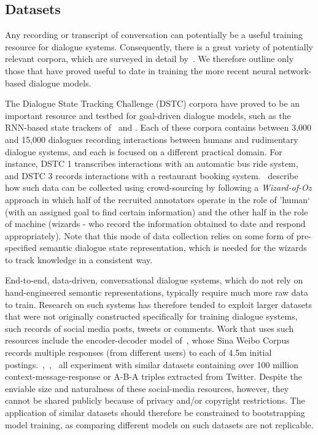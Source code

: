 \documentclass[11pt,letterpaper]{article}
\begin{document}
\subsection{Datasets}
Any recording or transcript of conversation can potentially be a useful training resource for dialogue systems. Consequently, there is a great variety of potentially relevant corpora, which are surveyed in detail by~\cite{serban2015survey}. We therefore outline only those that have proved useful to date in training the more recent neural network-based dialogue models.

The Dialogue State Tracking Challenge (DSTC) corpora have proved to be an important resource and testbed for goal-driven dialogue models, such as the RNN-based state trackers of~ and . Each of these corpora contains between 3,000 and 15,000 dialogues recording interactions between humans and rudimentary dialogue systems, and each is focused on a different practical domain. For instance, DSTC 1 transcribes interactions with an automatic bus ride system, and DSTC 3 records interactions with a restaurant booking system.~\cite{wen2016network} describe how such data can be collected using crowd-sourcing by following a \emph{Wizard-of-Oz} approach in which half of the recruited annotators operate in the role of 'human` (with an assigned goal to find certain information) and the other half in the role of machine (wizards - who record the information obtained to date and respond appropriately). Note that this mode of data collection relies on some form of pre-specified semantic dialogue state representation, which is needed for the wizards to track knowledge in a consistent way. 

End-to-end, data-driven, conversational dialogue systems, which do not rely on hand-engineered semantic representations, typically require much more raw data to train. Research on such systems has therefore tended to exploit larger datasets that were not originally constructed specifically for training dialogue systems, such records of social media posts, tweets or comments. Work that uses such resources include the encoder-decoder model of~\cite{shang2015neural}, whose Sina Weibo Corpus~\cite{shang2015neural} records multiple responses (from different users) to each of 4.5m initial postings.~,~,~ all experiment with similar datasets containing over 100 million context-message-response or A-B-A triples extracted from Twitter. Despite the enviable size and naturalness of these social-media resources, however, they cannot be shared publicly because of privacy and/or copyright restrictions. The application of similar datasets should therefore be constrained to bootstrapping model training, as comparing different models on such datasets are not replicable.
\end{document}
